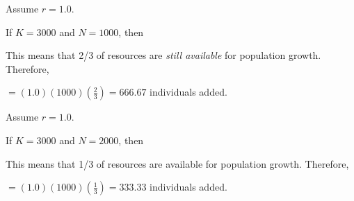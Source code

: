 \documentclass[t,handout]{beamer}  %
\begin{document}
\begin{frame}

\hangpara Assume $r = 1.0$.

\hangpara If $K = 3000$ and $N = 1000$, \pause then


\hangpara This means that 2/3 of resources are \emph{still available} for population growth. \pause Therefore,

  $= (1.0)(1000)(\frac{2}{3}) = 666.67$ individuals added.

\end{frame}


\begin{frame}

\hangpara Assume $r = 1.0$.

\hangpara If $K = 3000$ and $N = 2000$, \pause then


\hangpara This means that 1/3 of resources are available for population growth. \pause Therefore,

  $= (1.0)(1000)(\frac{1}{3}) = 333.33$ individuals added.

\end{frame}



{
\begin{frame}{}
\end{frame}
}
\end{document}
